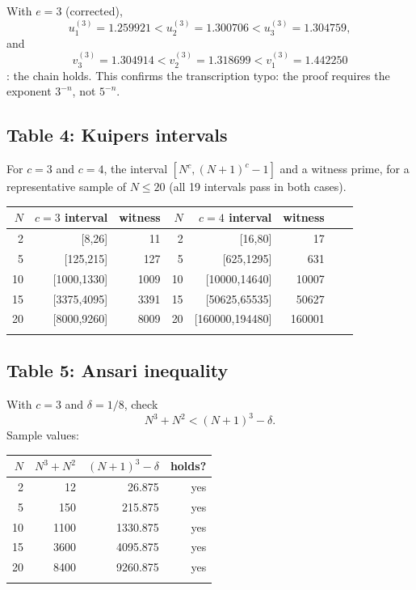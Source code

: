 \documentclass[11pt,reqno]{amsart}
\theoremstyle{redplain}
\numberwithin{equation}{section}
\begin{document}
\noindent%
With $e=3$ (corrected), 
\begin{equation}
u_{1}^{(3)}=1.259921<u_{2}^{(3)}=1.300706<u_{3}^{(3)}=1.304759,
\end{equation}
and 
\begin{equation}
v_{3}^{(3)}=1.304914<v_{2}^{(3)}=1.318699<v_{1}^{(3)}=1.442250
\end{equation}%
: the chain holds. This confirms the transcription typo: the proof requires
the exponent $3^{-n}$, not $5^{-n}$.

\subsection{Table 4: Kuipers intervals}

For $c=3$ and $c=4$, the interval $[N^c,(N+1)^c-1]$ and a witness prime, for
a representative sample of $N\le20$ (all 19 intervals pass in both cases).

\begin{center}
\begin{tabular}{rrrr|rrrr}
\toprule $N$ & $c=3$ interval & witness & $N$ & $c=4$ interval & witness & 
&  \\ 
\midrule 2 & [8,26] & 11 & 2 & [16,80] & 17 &  &  \\ 
5 & [125,215] & 127 & 5 & [625,1295] & 631 &  &  \\ 
10 & [1000,1330] & 1009 & 10 & [10000,14640] & 10007 &  &  \\ 
15 & [3375,4095] & 3391 & 15 & [50625,65535] & 50627 &  &  \\ 
20 & [8000,9260] & 8009 & 20 & [160000,194480] & 160001 &  &  \\ 
\bottomrule &  &  &  &  &  &  & 
\end{tabular}
\end{center}

\subsection{Table 5: Ansari inequality}

With $c=3$ and $\delta =1/8$, check%
\begin{equation}
N^{3}+N^{2}<(N+1)^{3}-\delta .
\end{equation}
Sample values:

\begin{center}
\begin{tabular}{rrrr}
\toprule $N$ & $N^3+N^2$ & $(N+1)^3-\delta$ & holds? \\ 
\midrule 2 & 12 & 26.875 & yes \\ 
5 & 150 & 215.875 & yes \\ 
10 & 1100 & 1330.875 & yes \\ 
15 & 3600 & 4095.875 & yes \\ 
20 & 8400 & 9260.875 & yes \\ 
\bottomrule &  &  & 
\end{tabular}
\end{center}
\end{document}
